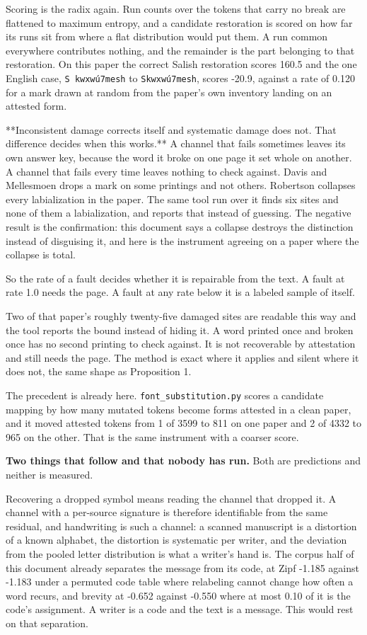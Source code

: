 Scoring is the radix again. Run counts over the tokens that carry no break are flattened to maximum entropy, and a candidate restoration is scored on how far its runs sit from where a flat distribution would put them. A run common everywhere contributes nothing, and the remainder is the part belonging to that restoration. On this paper the correct Salish restoration scores 160.5 and the one English case, \texttt{S kwxwú7mesh} to \texttt{Skwxwú7mesh}, scores -20.9, against a rate of 0.120 for a mark drawn at random from the paper's own inventory landing on an attested form.

**Inconsistent damage corrects itself and systematic damage does not. That difference decides when this works.** A channel that fails sometimes leaves its own answer key, because the word it broke on one page it set whole on another. A channel that fails every time leaves nothing to check against. Davis and Mellesmoen drops a mark on some printings and not others. Robertson collapses every labialization in the paper. The same tool run over it finds six sites and none of them a labialization, and reports that instead of guessing. The negative result is the confirmation: this document says a collapse destroys the distinction instead of disguising it, and here is the instrument agreeing on a paper where the collapse is total.

So the rate of a fault decides whether it is repairable from the text. A fault at rate 1.0 needs the page. A fault at any rate below it is a labeled sample of itself.

Two of that paper's roughly twenty-five damaged sites are readable this way and the tool reports the bound instead of hiding it. A word printed once and broken once has no second printing to check against. It is not recoverable by attestation and still needs the page. The method is exact where it applies and silent where it does not, the same shape as Proposition 1.

The precedent is already here. \texttt{font\_\allowbreak{}substitution.\allowbreak{}py} scores a candidate mapping by how many mutated tokens become forms attested in a clean paper, and it moved attested tokens from 1 of 3599 to 811 on one paper and 2 of 4332 to 965 on the other. That is the same instrument with a coarser score.

\textbf{Two things that follow and that nobody has run.} Both are predictions and neither is measured.

Recovering a dropped symbol means reading the channel that dropped it. A channel with a per-source signature is therefore identifiable from the same residual, and handwriting is such a channel: a scanned manuscript is a distortion of a known alphabet, the distortion is systematic per writer, and the deviation from the pooled letter distribution is what a writer's hand is. The corpus half of this document already separates the message from its code, at Zipf -1.185 against -1.183 under a permuted code table where relabeling cannot change how often a word recurs, and brevity at -0.652 against -0.550 where at most 0.10 of it is the code's assignment. A writer is a code and the text is a message. This would rest on that separation.

